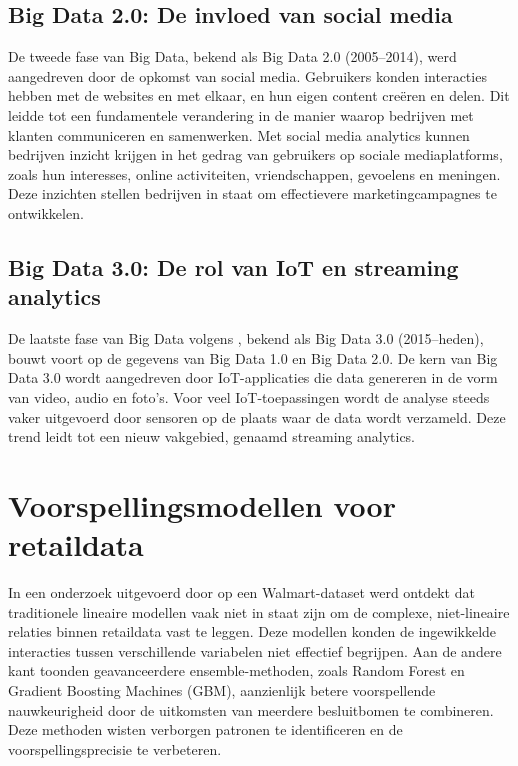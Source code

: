 \subsection{Big Data 2.0: De invloed van social media}  

De tweede fase van Big Data, bekend als Big Data 2.0 (2005–2014), werd aangedreven door de opkomst van social media. Gebruikers konden interacties hebben met de websites en met elkaar, en hun eigen content creëren en delen. Dit leidde tot een fundamentele verandering in de manier waarop bedrijven met klanten communiceren en samenwerken. Met social media analytics kunnen bedrijven inzicht krijgen in het gedrag van gebruikers op sociale mediaplatforms, zoals hun interesses, online activiteiten, vriendschappen, gevoelens en meningen. Deze inzichten stellen bedrijven in staat om effectievere marketingcampagnes te ontwikkelen.



\subsection{Big Data 3.0: De rol van IoT en streaming analytics}  

De laatste fase van Big Data volgens \textcite{Lee2017}, bekend als Big Data 3.0 (2015–heden), bouwt voort op de gegevens van Big Data 1.0 en Big Data 2.0. De kern van Big Data 3.0 wordt aangedreven door IoT-applicaties die data genereren in de vorm van video, audio en foto’s. Voor veel IoT-toepassingen wordt de analyse steeds vaker uitgevoerd door sensoren op de plaats waar de data wordt verzameld. Deze trend leidt tot een nieuw vakgebied, genaamd streaming analytics.



\section{Voorspellingsmodellen voor retaildata}  

In een onderzoek uitgevoerd door \textcite{Neba2024}  op een Walmart-dataset werd ontdekt dat traditionele lineaire modellen vaak niet in staat zijn om de complexe, niet-lineaire relaties binnen retaildata vast te leggen. Deze modellen konden de ingewikkelde interacties tussen verschillende variabelen niet effectief begrijpen. Aan de andere kant toonden geavanceerdere ensemble-methoden, zoals Random Forest en Gradient Boosting Machines (GBM), aanzienlijk betere voorspellende nauwkeurigheid door de uitkomsten van meerdere besluitbomen te combineren. Deze methoden wisten verborgen patronen te identificeren en de voorspellingsprecisie te verbeteren.

